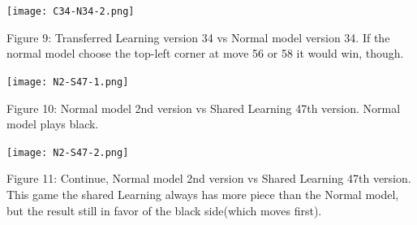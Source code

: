 \documentclass[12pt,a4paper]{report}
\begin{document}
\begin{center}
\texttt{[image: C34-N34-2.png]}\par
\end{center}
\begin{small}
Figure 9: Transferred Learning version 34 vs Normal model version 34. If the normal model choose the top-left corner at move 56 or 58 it would win, though.\par
\end{small}
\clearpage

\begin{center}
\texttt{[image: N2-S47-1.png]}\par
\end{center}
\begin{small}
Figure 10: Normal model 2nd version vs Shared Learning 47th version. Normal model plays black.\par
\end{small}
\clearpage

\begin{center}
\texttt{[image: N2-S47-2.png]}\par
\end{center}
\begin{small}
Figure 11: Continue, Normal model 2nd version vs Shared Learning 47th version. This game the shared Learning always has more piece than the Normal model, but the result still in favor of the black side(which moves first).\par
\end{small}
\clearpage
\end{document}
